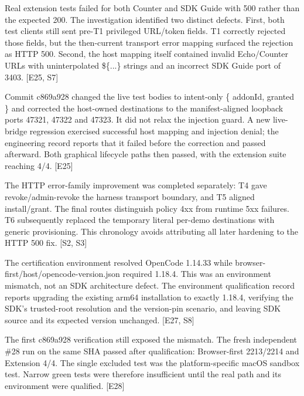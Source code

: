 \documentclass[11pt,letterpaper]{article}
\begin{document}
\vspace{3pt}{\normalsize\bfseries Admin-revoke HTTP 500 in the graphical path}\par
Real extension tests failed for both Counter and SDK Guide with 500 rather than the expected 200. The investigation identified two distinct defects. First, both test clients still sent pre-T1 privileged URL/token fields. T1 correctly rejected those fields, but the then-current transport error mapping surfaced the rejection as HTTP 500. Second, the host mapping itself contained invalid Echo/Counter URLs with uninterpolated \$\{...\} strings and an incorrect SDK Guide port of 3403. [E25, S7]\par
Commit c869a928 changed the live test bodies to intent-only \{ addonId, granted \} and corrected the host-owned destinations to the manifest-aligned loopback ports 47321, 47322 and 47323. It did not relax the injection guard. A new live-bridge regression exercised successful host mapping and injection denial; the engineering record reports that it failed before the correction and passed afterward. Both graphical lifecycle paths then passed, with the extension suite reaching 4/4. [E25]\par
The HTTP error-family improvement was completed separately: T4 gave revoke/admin-revoke the harness transport boundary, and T5 aligned install/grant. The final routes distinguish policy 4xx from runtime 5xx failures. T6 subsequently replaced the temporary literal per-demo destinations with generic provisioning. This chronology avoids attributing all later hardening to the HTTP 500 fix. [S2, S3]\par
\vspace{3pt}{\normalsize\bfseries OpenCode environment qualification}\par
The certification environment resolved OpenCode 1.14.33 while browser-first/host/opencode-version.json required 1.18.4. This was an environment mismatch, not an SDK architecture defect. The environment qualification record reports upgrading the existing arm64 installation to exactly 1.18.4, verifying the SDK's trusted-root resolution and the version-pin scenario, and leaving SDK source and its expected version unchanged. [E27, S8]\par
The first c869a928 verification still exposed the mismatch. The fresh independent \#28 run on the same SHA passed after qualification: Browser-first 2213/2214 and Extension 4/4. The single excluded test was the platform-specific macOS sandbox test. Narrow green tests were therefore insufficient until the real path and its environment were qualified. [E28]\par
\end{document}
